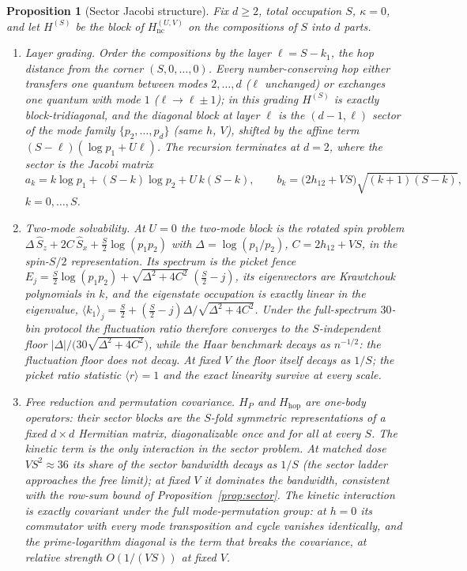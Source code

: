 \documentclass[11pt,a4paper]{article}
\theoremstyle{plain}
\newtheorem{proposition}[theorem]{Proposition}
\theoremstyle{definition}
\theoremstyle{remark}
\begin{document}
\begin{proposition}[Sector Jacobi structure]\label{prop:jacobi}
Fix $d\ge2$, total occupation $S$, $\kappa=0$, and let $H^{(S)}$ be the block of
$H_{\mathrm{nc}}^{(U,V)}$ on the compositions of $S$ into $d$ parts.
\begin{enumerate}[leftmargin=1.6em]
\item \emph{Layer grading.} Order the compositions by the layer
$\ell=S-k_{1}$, the hop distance from the corner $(S,0,\dots,0)$. Every
number-conserving hop either transfers one quantum between modes $2,\dots,d$
($\ell$ unchanged) or exchanges one quantum with mode $1$ ($\ell\to\ell\pm1$);
in this grading $H^{(S)}$ is exactly block-tridiagonal, and the diagonal block
at layer $\ell$ is the $(d-1,\ell)$ sector of the mode family
$\{p_{2},\dots,p_{d}\}$ (same $h$, $V$), shifted by the affine term
$(S-\ell)(\log p_{1}+U\ell)$. The recursion terminates at $d=2$, where the
sector is the Jacobi matrix
\begin{equation*}
a_k=k\log p_{1}+(S-k)\log p_{2}+U\,k(S-k),\qquad
b_k=\bigl(2h_{12}+VS\bigr)\sqrt{(k+1)(S-k)} ,
\end{equation*}
$k=0,\dots,S$.
\item \emph{Two-mode solvability.} At $U=0$ the two-mode block is the
rotated spin problem
$\Delta\,\hat S_{z}+2C\,\hat S_{x}+\tfrac{S}{2}\log(p_{1}p_{2})$ with
$\Delta=\log(p_{1}/p_{2})$, $C=2h_{12}+VS$, in the spin-$S/2$
representation. Its spectrum is the picket fence
$E_j=\tfrac{S}{2}\log(p_{1}p_{2})+\sqrt{\Delta^{2}+4C^{2}}\;(\tfrac{S}{2}-j)$,
its eigenvectors are Krawtchouk polynomials in $k$, and the eigenstate
occupation is exactly linear in the eigenvalue,
$\langle k_{1}\rangle_j=\tfrac{S}{2}+(\tfrac{S}{2}-j)\Delta/\sqrt{\Delta^{2}+4C^{2}}$.
Under the full-spectrum $30$-bin protocol the fluctuation ratio therefore
converges to the $S$-independent floor
$|\Delta|/\bigl(30\sqrt{\Delta^{2}+4C^{2}}\bigr)$, while the Haar benchmark
decays as $n^{-1/2}$: the fluctuation floor does not decay. At fixed $V$ the
floor itself decays as $1/S$; the picket ratio statistic $\langle
r\rangle=1$ and the exact linearity survive at every scale.
\item \emph{Free reduction and permutation covariance.} $H_{P}$ and
$H_{\mathrm{hop}}$ are one-body operators: their sector blocks are the
$S$-fold symmetric representations of a fixed $d\times d$ Hermitian matrix,
diagonalizable once and for all at every $S$. The kinetic term is the only
interaction in the sector problem. At matched dose $VS^{2}\approx36$ its
share of the sector bandwidth decays as $1/S$ (the sector ladder approaches
the free limit); at fixed $V$ it dominates the bandwidth, consistent with
the row-sum bound of Proposition~\ref{prop:sector}. The kinetic interaction
is exactly covariant under the full mode-permutation group: at $h=0$ its
commutator with every mode transposition and cycle vanishes identically,
and the prime-logarithm diagonal is the term that breaks the covariance, at
relative strength $O(1/(VS))$ at fixed $V$.
\end{enumerate}
\end{proposition}
\end{document}
